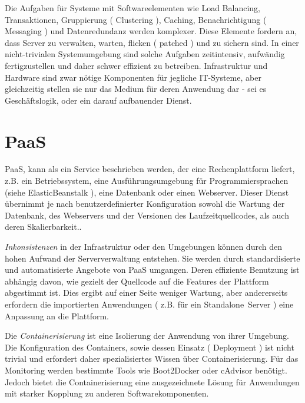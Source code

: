 \documentclass[
12pt,
english,
ngerman,
headsepline,
twoside,
openright,
numbers=noenddot,version=first
]{scrreprt}
\begin{document}
Die Aufgaben\label{sec:iaas-aufgaben} für Systeme mit Softwareelementen wie Load Balancing, Transaktionen, Gruppierung ( Clustering ), Caching, Benachrichtigung ( Messaging ) und Datenredundanz werden komplexer. Diese Elemente fordern an, dass Server zu verwalten, warten, flicken ( patched ) und zu sichern sind. In einer nicht-trivialen Systemumgebung sind solche Aufgaben zeitintensiv, aufwändig fertigzustellen und daher schwer effizient zu betreiben. Infrastruktur und Hardware sind zwar nötige Komponenten für jegliche IT-Systeme, aber gleichzeitig stellen sie nur das Medium für deren Anwendung dar - sei es Geschäftslogik, oder ein darauf aufbauender Dienst.\cite{cloudEssentials}

\section{PaaS}
\label{sec:paas}
\acrfull{PaaS}, kann als ein Service beschrieben werden, der eine Rechenplattform liefert, z.B. ein Betriebssystem, eine Ausführungsumgebung für Programmiersprachen (siehe ElasticBeanstalk \cite{ebs}), eine Datenbank oder einen Webserver. Dieser Dienst übernimmt je nach benutzerdefinierter Konfiguration sowohl die Wartung der Datenbank, des Webservers und der Versionen des Laufzeitquellcodes, als auch deren Skalierbarkeit.\cite{patternAWS}.


\textit{Inkonsistenzen} in der Infrastruktur oder den Umgebungen können durch den hohen Aufwand der Serververwaltung entstehen. Sie werden durch standardisierte und automatisierte Angebote von \acrshort{PaaS} umgangen. Deren effiziente Benutzung ist abhängig davon, wie gezielt der Quellcode auf die Features der Plattform abgestimmt ist. Dies ergibt auf einer Seite weniger Wartung, aber andererseits erfordern die importierten Anwendungen ( z.B. für ein \glqq Standalone\grqq\ Server ) eine Anpassung an die Plattform.

Die \textit{Containerisierung}\label{par:containerisation} ist eine Isolierung der Anwendung von ihrer Umgebung. Die Konfiguration des Containers, sowie dessen Einsatz ( Deployment ) ist nicht trivial und erfordert daher spezialisiertes Wissen über Containerisierung. Für das Monitoring werden bestimmte Tools wie Boot2Docker \cite{Boot2Docker} oder cAdvisor \cite{cAdvisor} benötigt. Jedoch bietet die Containerisierung eine ausgezeichnete Lösung für Anwendungen mit starker Kopplung zu anderen Softwarekomponenten.\cite{patternAWS}

\end{document}
